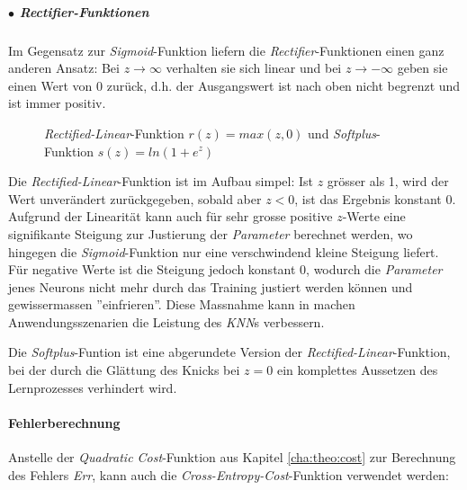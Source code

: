 \subparagraph{$\bullet$ Rectifier-Funktionen} Im Gegensatz zur \textit{Sigmoid}-Funktion liefern die \textit{Rectifier}-Funktionen einen ganz anderen Ansatz: Bei $z\rightarrow \infty$ verhalten sie sich linear und bei $z\rightarrow -\infty$ geben sie einen Wert von 0 zurück, d.h. der Ausgangswert ist nach oben nicht begrenzt und ist immer positiv.

\begin{figure}[h]
	\centering
	\caption[\textit{Rectified-Linear}-Funktion \& \textit{Softplus}-Funktion]{\textit{Rectified-Linear}-Funktion $r(z) = max(z,0)$ und \textit{Softplus}-Funktion $s(z) = ln(1+e^z)$}
	\label{plt:rect_lin}
\end{figure}

Die \textit{Rectified-Linear}-Funktion ist im Aufbau simpel: Ist $z$ grösser als 1, wird der Wert unverändert zurückgegeben, sobald aber $z<0$, ist das Ergebnis konstant 0. Aufgrund der Linearität kann auch für sehr grosse positive $z$-Werte eine signifikante Steigung zur Justierung der \textit{Parameter} berechnet werden, wo hingegen die \textit{Sigmoid}-Funktion nur eine verschwindend kleine Steigung liefert. Für negative Werte ist die Steigung jedoch konstant 0, wodurch die \textit{Parameter} jenes Neurons nicht mehr durch das Training justiert werden können und gewissermassen ''einfrieren''. Diese Massnahme kann in machen Anwendungsszenarien die Leistung des \textit{KNN}s verbessern.

Die \textit{Softplus}-Funtion ist eine abgerundete Version der \textit{Rectified-Linear}-Funktion, bei der durch die Glättung des Knicks bei $z=0$ ein komplettes Aussetzen des Lernprozesses verhindert wird.

\paragraph{Fehlerberechnung}
Anstelle der \textit{Quadratic Cost}-Funktion aus Kapitel \ref{cha:theo:cost} zur Berechnung des Fehlers \textit{Err}, kann auch die \textit{Cross-Entropy-Cost}-Funktion verwendet werden:

